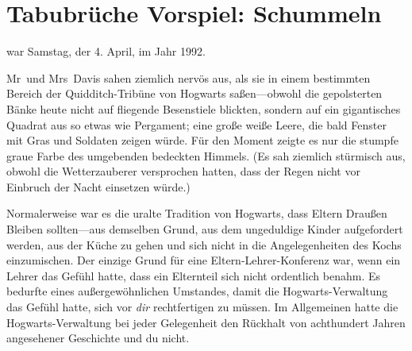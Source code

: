 \chapter{Tabubrüche Vorspiel: Schummeln}

 war Samstag, der 4. April, im Jahr 1992.

\hplettrineextrapara
Mr~und Mrs~Davis sahen ziemlich nervös aus, als sie in einem bestimmten Bereich der Quidditch-Tribüne von Hogwarts saßen—obwohl die gepolsterten Bänke heute nicht auf fliegende Besenstiele blickten, sondern auf ein gigantisches Quadrat aus so etwas wie Pergament; eine große weiße Leere, die bald Fenster mit Gras und Soldaten zeigen würde. Für den Moment zeigte es nur die stumpfe graue Farbe des umgebenden bedeckten Himmels. (Es sah ziemlich stürmisch aus, obwohl die Wetterzauberer versprochen hatten, dass der Regen nicht vor Einbruch der Nacht einsetzen würde.)

Normalerweise war es die uralte Tradition von Hogwarts, dass Eltern Draußen Bleiben sollten—aus demselben Grund, aus dem ungeduldige Kinder aufgefordert werden, aus der Küche zu gehen und sich nicht in die Angelegenheiten des Kochs einzumischen. Der einzige Grund für eine Eltern-Lehrer-Konferenz war, wenn ein Lehrer das Gefühl hatte, dass ein Elternteil sich nicht ordentlich benahm. Es bedurfte eines außergewöhnlichen Umstandes, damit die Hogwarts-Verwaltung das Gefühl hatte, sich vor \emph{dir} rechtfertigen zu müssen. Im Allgemeinen hatte die Hogwarts-Verwaltung bei jeder Gelegenheit den Rückhalt von achthundert Jahren angesehener Geschichte und du nicht.

